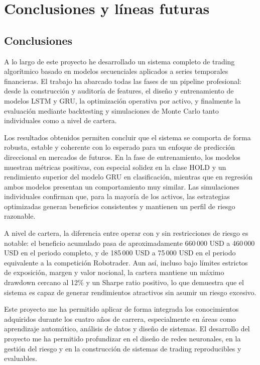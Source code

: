 \setlength{\parindent}{0em}

\chapter{Conclusiones y líneas futuras}\label{cap5}\thispagestyle{fancy}

\vspace{-1.3cm}

\section{Conclusiones}

A lo largo de este proyecto he desarrollado un sistema completo de trading algorítmico basado en modelos secuenciales aplicados a series temporales
financieras. El trabajo ha abarcado todas las fases de un pipeline profesional: desde la construcción y auditoría de features, el diseño y
entrenamiento de modelos LSTM y GRU, la optimización operativa por activo, y finalmente la evaluación mediante backtesting y simulaciones de Monte
Carlo tanto individuales como a nivel de cartera.

Los resultados obtenidos permiten concluir que el sistema se comporta de forma robusta, estable y coherente con lo esperado para un enfoque de
predicción direccional en mercados de futuros. En la fase de entrenamiento, los modelos muestran métricas positivas, con especial solidez en la clase
HOLD y un rendimiento superior del modelo GRU en clasificación, mientras que en regresión ambos modelos presentan un comportamiento muy similar. Las
simulaciones individuales confirman que, para la mayoría de los activos, las estrategias optimizadas generan beneficios consistentes y mantienen un
perfil de riesgo razonable.

A nivel de cartera, la diferencia entre operar con y sin restricciones de riesgo es notable: el beneficio acumulado pasa de aproximadamente 660\,000
USD a 460\,000 USD en el periodo completo, y de 185\,000 USD a 75\,000 USD en el periodo equivalente a la competición Robotrader. Aun así, incluso
bajo límites estrictos de exposición, margen y valor nocional, la cartera mantiene un máximo drawdown cercano al 12\% y un Sharpe ratio positivo, lo
que demuestra que el sistema es capaz de generar rendimientos atractivos sin asumir un riesgo excesivo.

Este proyecto me ha permitido aplicar de forma integrada los conocimientos adquiridos durante los cuatro años de carrera, especialmente en áreas como
aprendizaje automático, análisis de datos y diseño de sistemas. El desarrollo del proyecto me ha permitido profundizar en el diseño de redes
neuronales, en la gestión del riesgo y en la construcción de sistemas de trading reproducibles y evaluables.

